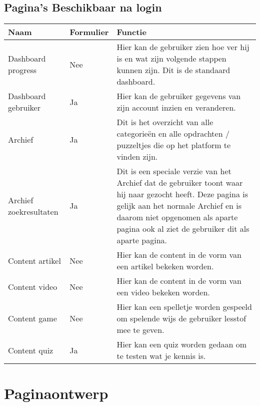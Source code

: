 \documentclass[]{report}
\begin{document}
\section{Pagina's Beschikbaar na login}
\begin{tabular}{ p{4cm} l p{6cm} }
	\textbf{Naam} & \textbf{Formulier} & \textbf{Functie} \\ \hline
	Dashboard progress 	& Nee		& Hier kan de gebruiker zien hoe ver hij is en wat zijn volgende stappen kunnen zijn. Dit is de standaard dashboard. \\
	Dashboard gebruiker	& Ja		& Hier kan de gebruiker gegevens van zijn account inzien en veranderen. \\
	Archief 			& Ja		& Dit is het overzicht van alle categorieën en alle opdrachten / puzzeltjes die op het platform te vinden zijn. \\ 
	Archief zoekresultaten	& Ja 	& Dit is een speciale verzie van het Archief dat de gebruiker toont waar hij naar gezocht heeft. Deze pagina is gelijk aan het normale Archief en is daarom niet opgenomen als aparte pagina ook al ziet de gebruiker dit als aparte pagina.  \\
	Content artikel 	& Nee		& Hier kan de content in de vorm van een artikel bekeken worden.  \\
	Content video 		& Nee 		& Hier kan de content in de vorm van een video bekeken worden. \\
	Content game 		& Nee 		& Hier kan een spelletje worden gespeeld om spelende wijs de gebruiker lesstof mee te geven. \\
	Content quiz 		& Ja 		& Hier kan een quiz worden gedaan om te testen wat je kennis is. \\
\end{tabular}







\chapter{Paginaontwerp}
\end{document}
